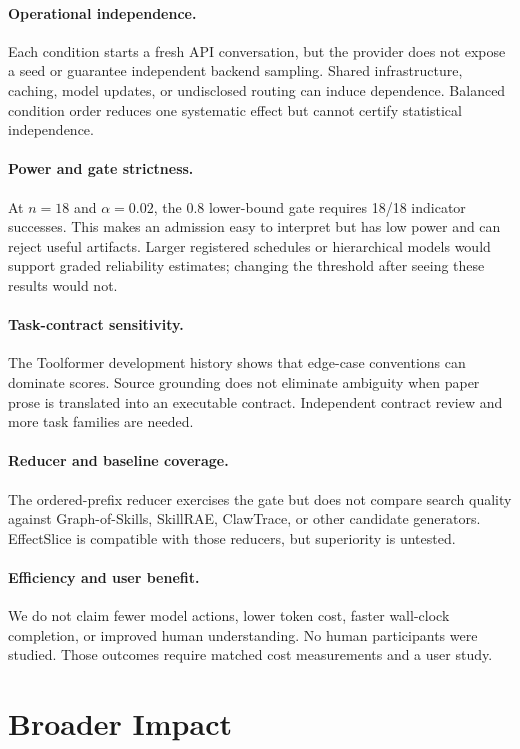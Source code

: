 \documentclass[letterpaper]{article} %
\begin{document}
\paragraph{Operational independence.}
Each condition starts a fresh API conversation, but the provider does not expose
a seed or guarantee independent backend sampling.  Shared infrastructure,
caching, model updates, or undisclosed routing can induce dependence.  Balanced
condition order reduces one systematic effect but cannot certify statistical
independence.

\paragraph{Power and gate strictness.}
At $n=18$ and $\alpha=0.02$, the 0.8 lower-bound gate requires 18/18 indicator
successes.  This makes an admission easy to interpret but has low power and can
reject useful artifacts.  Larger registered schedules or hierarchical models
would support graded reliability estimates; changing the threshold after
seeing these results would not.

\paragraph{Task-contract sensitivity.}
The Toolformer development history shows that edge-case conventions can
dominate scores.  Source grounding does not eliminate ambiguity when paper
prose is translated into an executable contract.  Independent contract review
and more task families are needed.

\paragraph{Reducer and baseline coverage.}
The ordered-prefix reducer exercises the gate but does not compare search
quality against Graph-of-Skills, SkillRAE, ClawTrace, or other candidate
generators.  EffectSlice is compatible with those reducers, but superiority is
untested.

\paragraph{Efficiency and user benefit.}
We do not claim fewer model actions, lower token cost, faster wall-clock
completion, or improved human understanding.  No human participants were
studied.  Those outcomes require matched cost measurements and a user study.

\section{Broader Impact}
\end{document}
